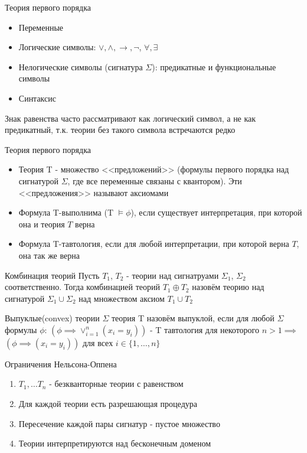\documentclass{beamer}
\begin{document}
\begin{frame}{Теория первого порядка}
\begin{itemize}
\item Переменные
\item Логические символы: $\vee, \wedge, \rightarrow, \lnot$, $\forall, \exists$
\item Нелогические символы (сигнатура $\Sigma$): предикатные и функциональные символы
\item Синтаксис
\end{itemize}
Знак равенства часто рассматривают как логический символ, а не как предикатный, т.к. теории без такого символа встречаются редко
\end{frame}

\begin{frame}{Теория первого порядка}
\begin{itemize}
\item Теория T - множество <<предложений>> (формулы первого порядка над сигнатурой $\Sigma$, где все переменные связаны с
квантором). Эти <<предложения>> называют аксиомами
\item Формула T-выполнима (T $\vDash \phi$), если существует интерпретация, при которой она и теория $T$ верна
\item Формула T-тавтология, если для любой интерпретации, при которой верна $T$, она так же верна
\end{itemize}
\end{frame}

\begin{frame}{Комбинация теорий}
Пусть $T_1$, $T_2$ - теории над сигнатруами $\Sigma_1$, $\Sigma_2$ соответственно. Тогда комбинацией теорий $T_1 \oplus T_2$
назовём теорию над сигнатурой $\Sigma_1 \cup \Sigma_2$ над множеством аксиом $T_1 \cup T_2$
\end{frame}

\begin{frame}{Выпуклые(convex) теории}
$\Sigma$ теория T назовём выпуклой, если для любой $\Sigma$ формулы $\phi$:\newline
$(\phi \implies \vee_{i=1}^{n}(x_i=y_i))$ - T тавтология для некоторого $n > 1 \implies$\newline
$(\phi \implies (x_i=y_i))$ для всех $i \in \{1, \dots, n\}$
\end{frame}

\begin{frame}{Ограничения Нельсона-Оппена}
\begin{enumerate}
\item $T_1, \dots T_n$ - безкванторные теории с равенством
\item Для каждой теории есть разрешающая процедура
\item Пересечение каждой пары сигнатур - пустое множество
\item Теории интерпретируются над бесконечным доменом
\end{enumerate}
\end{frame}
\end{document}
